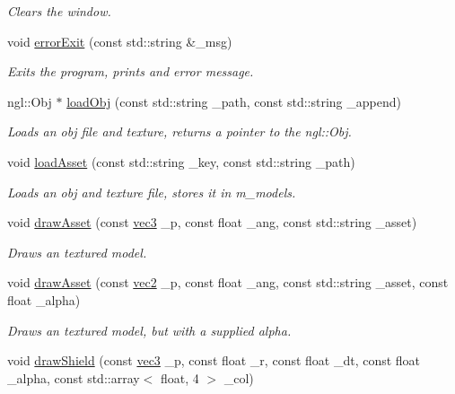 \begin{DoxyCompactItemize}
\begin{DoxyCompactList}\small\item\em Clears the window. \end{DoxyCompactList}\item 
void \hyperlink{classrenderer__ngl_a24783a427b22c7f6f2f52e1ffa4c4322}{error\-Exit} (const std\-::string \&\-\_\-msg)
\begin{DoxyCompactList}\small\item\em Exits the program, prints and error message. \end{DoxyCompactList}\item 
ngl\-::\-Obj $\ast$ \hyperlink{classrenderer__ngl_ab881da5a90bb5e8891b5c0a6cbee3101}{load\-Obj} (const std\-::string \-\_\-path, const std\-::string \-\_\-append)
\begin{DoxyCompactList}\small\item\em Loads an obj file and texture, returns a pointer to the ngl\-::\-Obj. \end{DoxyCompactList}\item 
void \hyperlink{classrenderer__ngl_a42887efb2959cf6d5f13907ef898e45c}{load\-Asset} (const std\-::string \-\_\-key, const std\-::string \-\_\-path)
\begin{DoxyCompactList}\small\item\em Loads an obj and texture file, stores it in m\-\_\-models. \end{DoxyCompactList}\item 
void \hyperlink{classrenderer__ngl_add771866e6e27910d453f53acc38eb6b}{draw\-Asset} (const \hyperlink{structvec3}{vec3} \-\_\-p, const float \-\_\-ang, const std\-::string \-\_\-asset)
\begin{DoxyCompactList}\small\item\em Draws an textured model. \end{DoxyCompactList}\item 
void \hyperlink{classrenderer__ngl_a0d40948a440705a450b2a5a782b99111}{draw\-Asset} (const \hyperlink{structvec2}{vec2} \-\_\-p, const float \-\_\-ang, const std\-::string \-\_\-asset, const float \-\_\-alpha)
\begin{DoxyCompactList}\small\item\em Draws an textured model, but with a supplied alpha. \end{DoxyCompactList}\item 
void \hyperlink{classrenderer__ngl_ab0969a50b535e72b2ebdbb2848a073fc}{draw\-Shield} (const \hyperlink{structvec3}{vec3} \-\_\-p, const float \-\_\-r, const float \-\_\-dt, const float \-\_\-alpha, const std\-::array$<$ float, 4 $>$ \-\_\-col)

\end{DoxyCompactItemize}
